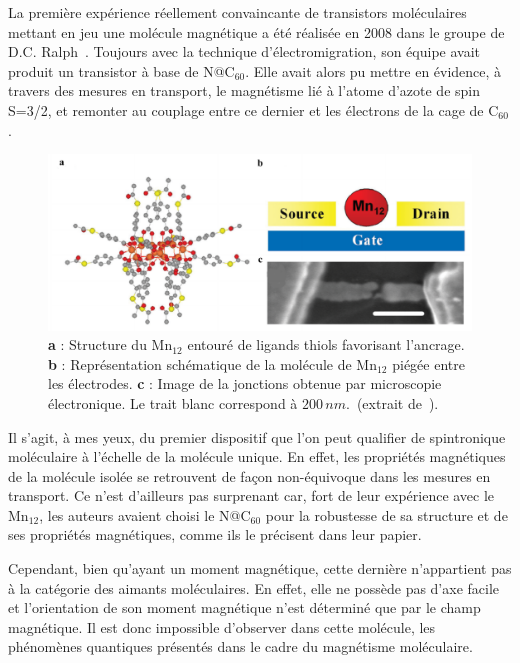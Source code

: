 La première expérience réellement convaincante de transistors moléculaires mettant en jeu une molécule magnétique a été réalisée en 2008 dans le groupe de D.C. Ralph~\cite{Grose2008}. Toujours avec la technique d'électromigration, son équipe avait produit un transistor à base de N@C$_{60}$. Elle avait alors pu mettre en évidence, à travers des mesures en transport, le magnétisme lié à l'atome d'azote de spin S=3/2,  et remonter au couplage entre ce dernier et les électrons de la cage de C$_{60}$. 

\begin{figure}
\centering \includegraphics[scale=0.45]{Spintronique/MolSpintro/MolSpintro.pdf}
\caption{\textbf{a} : Structure du Mn$_{12}$ entouré de ligands thiols favorisant l'ancrage. \textbf{b} : Représentation schématique de la molécule de Mn$_{12}$ piégée entre les électrodes. \textbf{c} : Image de la jonctions obtenue par microscopie électronique. Le trait blanc correspond à $200\,nm$.~(extrait de~\cite{Heersche2006}).}
\label{MolSpintro}
\end{figure}

Il s'agit, à mes yeux, du premier dispositif que l'on peut qualifier de spintronique moléculaire à l'échelle de la molécule unique. En effet, les propriétés magnétiques de la molécule isolée se retrouvent de façon non-équivoque dans les mesures en transport. Ce n'est d'ailleurs pas surprenant car, fort de leur expérience avec le Mn$_{12}$, les auteurs avaient choisi le N@C$_{60}$ pour la robustesse de sa structure et de ses propriétés magnétiques, comme ils le précisent dans leur papier. 

Cependant, bien qu'ayant un moment magnétique, cette dernière n'appartient pas à la catégorie des aimants moléculaires. En effet, elle ne possède pas d'axe facile et l'orientation de son moment magnétique n'est déterminé que par le champ magnétique. Il est donc impossible d'observer dans cette molécule, les phénomènes quantiques présentés dans le cadre du magnétisme moléculaire.

